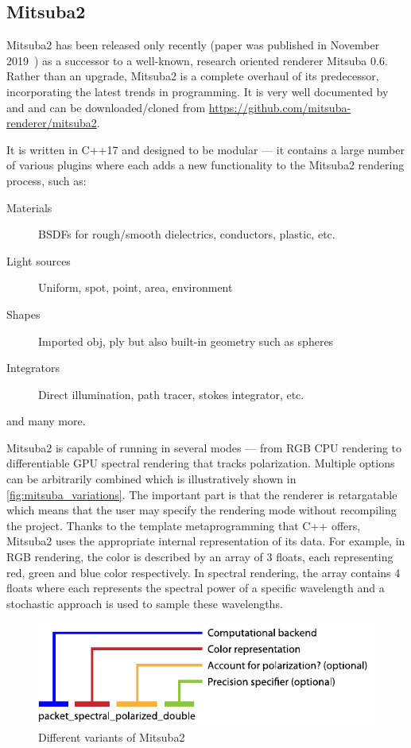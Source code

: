 \subsection{Mitsuba2}

Mitsuba2 has been released only recently (paper was published in November 2019~\cite{nimier2019mitsuba}) as a successor to a well-known, research oriented renderer Mitsuba 0.6. Rather than an upgrade, Mitsuba2 is a complete overhaul of its predecessor, incorporating the latest trends in programming. It is very well documented by \citet{mitsubaWeb} and \citet{nimier2019mitsuba} and can be downloaded/cloned from \url{https://github.com/mitsuba-renderer/mitsuba2}.

It is written in C++17 and designed to be modular --- it contains a large number of various plugins where each adds a new functionality to the Mitsuba2 rendering process, such as:

\begin{description}
	\item[Materials] BSDFs for rough/smooth dielectrics, conductors, plastic, etc.
	\item[Light sources] Uniform, spot, point, area, environment
	\item[Shapes] Imported obj, ply but also built-in geometry such as spheres
	\item[Integrators] Direct illumination, path tracer, stokes integrator, etc.
\end{description}

and many more.

Mitsuba2 is capable of running in several modes --- from RGB CPU rendering to differentiable GPU spectral rendering that tracks polarization. Multiple options can be arbitrarily combined which is illustratively shown in \autoref{fig:mitsuba_variations}. The important part is that the renderer is retargatable which means that the user may specify the rendering mode without recompiling the project. Thanks to the template metaprogramming that C++ offers, Mitsuba2 uses the appropriate internal representation of its data. For example, in RGB rendering, the color is described by an array of 3 floats, each representing red, green and blue color respectively. In spectral rendering, the array contains 4 floats where each represents the spectral power of a specific wavelength and a stochastic approach is used to sample these wavelengths.

\begin{figure}
	\centering
	\includegraphics[width=0.8\linewidth]{img/mitsuba_variants.pdf}
	\caption{Different variants of Mitsuba2}
	\label{fig:mitsuba_variations}
\end{figure}

